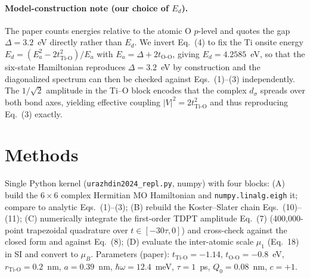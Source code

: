 \documentclass[11pt]{article}
\begin{document}
\paragraph{Model-construction note (our choice of $E_d$).}
The paper counts energies relative to the atomic O $p$-level and quotes the gap
$\Delta=3.2$~eV directly rather than $E_d$. We invert Eq.~(4) to fix the Ti onsite
energy $E_d = (E_a^2-2t_{\mathrm{Ti\text{-}O}}^2)/E_a$ with $E_a=\Delta+2t_{\mathrm{O\text{-}O}}$,
giving $E_d=4.2585$~eV, so that the six-state Hamiltonian reproduces $\Delta=3.2$~eV by
construction and the diagonalized spectrum can then be checked against Eqs.~(1)--(3)
independently. The $1/\sqrt2$ amplitude in the Ti--O block encodes that the complex
$d_\sigma$ spreads over both bond axes, yielding effective coupling $|V|^2=2t_{\mathrm{Ti\text{-}O}}^2$
and thus reproducing Eq.~(3) exactly.

\section{Methods}
Single Python kernel (\texttt{urazhdin2024\_repl.py}, numpy) with four blocks:
(A) build the $6\times6$ complex Hermitian MO Hamiltonian and \texttt{numpy.linalg.eigh}
it; compare to analytic Eqs.~(1)--(3); (B) rebuild the Koster--Slater chain Eqs.~(10)--(11);
(C) numerically integrate the first-order TDPT amplitude Eq.~(7) (400{,}000-point trapezoidal
quadrature over $t\in[-30\tau,0]$) and cross-check against the closed form and against
Eq.~(8); (D) evaluate the inter-atomic scale $\mu_1$ (Eq.~18) in SI and convert to $\mu_B$.
Parameters (paper): $t_{\mathrm{Ti\text{-}O}}=-1.14$, $t_{\mathrm{O\text{-}O}}=-0.8$~eV,
$r_{\mathrm{Ti\text{-}O}}=0.2$~nm, $a=0.39$~nm, $\hbar\omega=12.4$~meV, $\tau=1$~ps,
$Q_0=0.08$~nm, $c=+1$.
\end{document}
